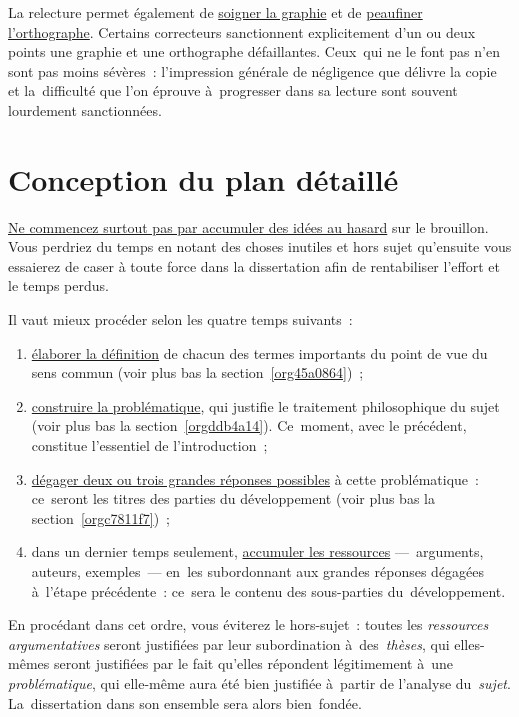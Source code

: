 \documentclass[a4paper,12pt]{report}
\begin{document}
La relecture permet également de \uline{soigner la graphie} et de \uline{peaufiner
l'orthographe}. Certains correcteurs sanctionnent explicitement d'un ou
deux points une graphie et une orthographe défaillantes. Ceux qui ne le
font pas n'en sont pas moins sévères : l'impression générale de
négligence que délivre la copie et la difficulté que l'on éprouve
à progresser dans sa lecture sont souvent lourdement sanctionnées.


\chapter{Conception du plan détaillé}
\label{sec:org87ff5c2}

\uline{Ne commencez surtout pas par accumuler des idées au hasard} sur le
brouillon. Vous perdriez du temps en notant des choses inutiles et hors
sujet qu'ensuite vous essaierez de caser à toute force dans la
dissertation afin de rentabiliser l'effort et le temps perdus.

Il vaut mieux procéder selon les quatre temps suivants :

\begin{enumerate}
\item \uline{élaborer la définition} de chacun des termes importants du point de
vue du sens commun (voir plus bas la section \ref{org45a0864}) ;

\item \uline{construire la problématique}, qui justifie le traitement
philosophique du sujet (voir plus bas la section \ref{orgddb4a14}).
Ce moment, avec le précédent, constitue l'essentiel de
l'introduction ;

\item \uline{dégager deux ou trois grandes réponses possibles} à cette
problématique : ce seront les titres des parties du développement
(voir plus bas la section \ref{orgc7811f7}) ;

\item dans un dernier temps seulement, \uline{accumuler les ressources}
--- arguments, auteurs, exemples --- en les subordonnant aux grandes
réponses dégagées à l'étape précédente : ce sera le contenu des
sous-parties du développement.
\end{enumerate}

En procédant dans cet ordre, vous éviterez le hors-sujet : toutes les
\emph{ressources argumentatives} seront justifiées par leur subordination
à des \emph{thèses}, qui elles-mêmes seront justifiées par le fait qu'elles
répondent légitimement à une \emph{problématique}, qui elle-même aura été
bien justifiée à partir de l'analyse du \emph{sujet}. La dissertation dans
son ensemble sera alors bien fondée.
\end{document}
